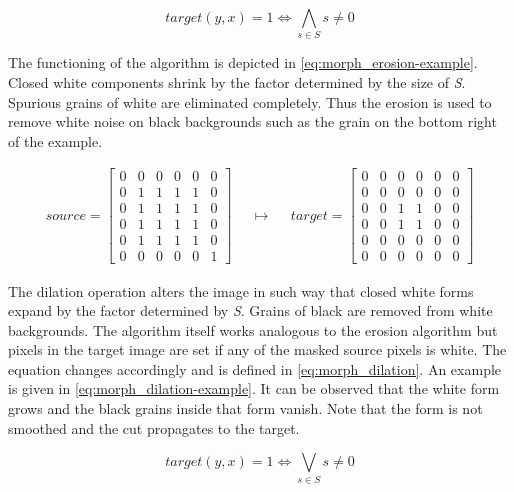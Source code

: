 \documentclass{report}
\begin{document}
\begin{equation}\label{eq:morph_erosion}
  target(y, x) = 1 \iff \bigwedge_{s \in S} s \neq 0
\end{equation}

The functioning of the algorithm is depicted in
\ref{eq:morph_erosion-example}. Closed white components shrink by the
factor determined by the size of \textit{S}. Spurious grains of white
are eliminated completely. Thus the erosion is used to remove white
noise on black backgrounds such as the grain on the bottom right of
the example.

\begin{align}\label{eq:morph_erosion-example}
  source = \begin{bmatrix}
    0 & 0 & 0 & 0 & 0 & 0 \\
    0 & 1 & 1 & 1 & 1 & 0 \\
    0 & 1 & 1 & 1 & 1 & 0 \\
    0 & 1 & 1 & 1 & 1 & 0 \\
    0 & 1 & 1 & 1 & 1 & 0 \\
    0 & 0 & 0 & 0 & 0 & 1
  \end{bmatrix}
  & &
  \mapsto
  & &
  target = \begin{bmatrix}
    0 & 0 & 0 & 0 & 0 & 0 \\
    0 & 0 & 0 & 0 & 0 & 0 \\
    0 & 0 & 1 & 1 & 0 & 0 \\
    0 & 0 & 1 & 1 & 0 & 0 \\
    0 & 0 & 0 & 0 & 0 & 0 \\
    0 & 0 & 0 & 0 & 0 & 0
  \end{bmatrix}
\end{align}

The dilation operation alters the image in such way that closed white
forms expand by the factor determined by \textit{S}. Grains of black
are removed from white backgrounds. The algorithm itself works
analogous to the erosion algorithm but pixels in the target image are
set if any of the masked source pixels is white. The equation changes
accordingly and is defined in \ref{eq:morph_dilation}. An example is
given in \ref{eq:morph_dilation-example}. It can be observed that the
white form grows and the black grains inside that form vanish. Note
that the form is not smoothed and the cut propagates to the target.

\begin{equation}\label{eq:morph_dilation}
  target(y, x) = 1 \iff \bigvee_{s \in S} s \neq 0
\end{equation}
\end{document}
